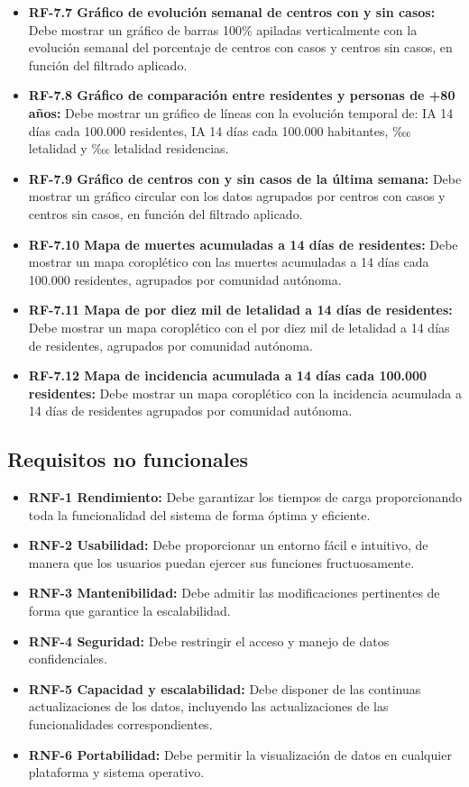 \begin{itemize}
\begin{itemize}
            \item \textbf{RF-7.7 Gráfico de evolución semanal de centros con y sin casos:}
             Debe mostrar un gráfico de barras 100\% apiladas verticalmente con la evolución semanal del porcentaje de centros con casos y centros sin casos, en función del filtrado aplicado.
            \item \textbf{RF-7.8 Gráfico de comparación entre residentes y personas de +80 años:}  Debe mostrar un gráfico de líneas con la evolución temporal de: IA 14 días cada 100.000 residentes, IA 14 días cada 100.000 habitantes, ‱ letalidad y  ‱ letalidad  residencias.
            \item \textbf{RF-7.9 Gráfico de centros con y sin casos de la última semana:} Debe mostrar un gráfico circular con los datos agrupados por centros con casos y centros sin casos, en función del filtrado aplicado.
            \item\textbf{RF-7.10 Mapa de muertes acumuladas a 14 días de residentes:} Debe mostrar un mapa coroplético con las muertes acumuladas a 14 días cada 100.000 residentes, agrupados por comunidad autónoma.
            \item\textbf{RF-7.11 Mapa de por diez mil de letalidad a 14 días de residentes:} Debe mostrar un mapa coroplético con el por diez mil de letalidad a 14 días de residentes, agrupados por comunidad autónoma.
            \item\textbf{RF-7.12 Mapa de incidencia acumulada a 14 días cada 100.000 residentes:} Debe mostrar un mapa coroplético con la incidencia acumulada a 14 días de residentes agrupados por comunidad autónoma.
    \end{itemize} 
\end{itemize}
\subsection{Requisitos no funcionales}
\begin{itemize}
    \tightlist
    \item \textbf{RNF-1 Rendimiento:} Debe garantizar los tiempos de carga proporcionando toda la funcionalidad del sistema de forma óptima y eficiente.
    \item \textbf{RNF-2 Usabilidad:} Debe proporcionar un entorno fácil e intuitivo, de manera que los usuarios puedan ejercer sus funciones fructuosamente.
    \item \textbf{RNF-3 Mantenibilidad:} Debe admitir las modificaciones pertinentes de forma que garantice la escalabilidad.
    \item \textbf{RNF-4 Seguridad:} Debe restringir el acceso y manejo de datos confidenciales.
    \item \textbf{RNF-5 Capacidad y escalabilidad:} Debe disponer de las continuas actualizaciones de los datos, incluyendo las actualizaciones de las funcionalidades correspondientes.
    \item \textbf{RNF-6 Portabilidad:} Debe permitir la visualización de datos en cualquier plataforma y sistema operativo.
    

\end{itemize}
